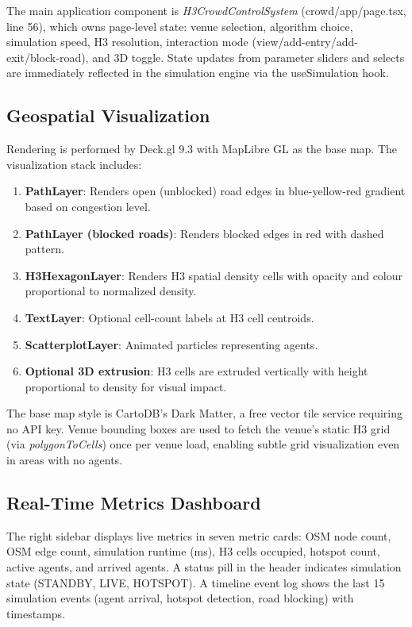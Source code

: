\documentclass[conference]{IEEEtran}
\begin{document}
The main application component is \textit{H3CrowdControlSystem} (crowd/app/page.tsx, line 56), which owns page-level state: venue selection, algorithm choice, simulation speed, H3 resolution, interaction mode (view/add-entry/add-exit/block-road), and 3D toggle. State updates from parameter sliders and selects are immediately reflected in the simulation engine via the useSimulation hook.

\subsection{Geospatial Visualization}

Rendering is performed by Deck.gl 9.3 with MapLibre GL as the base map. The visualization stack includes:

\begin{enumerate}
\item \textbf{PathLayer}: Renders open (unblocked) road edges in blue-yellow-red gradient based on congestion level.
\item \textbf{PathLayer (blocked roads)}: Renders blocked edges in red with dashed pattern.
\item \textbf{H3HexagonLayer}: Renders H3 spatial density cells with opacity and colour proportional to normalized density.
\item \textbf{TextLayer}: Optional cell-count labels at H3 cell centroids.
\item \textbf{ScatterplotLayer}: Animated particles representing agents.
\item \textbf{Optional 3D extrusion}: H3 cells are extruded vertically with height proportional to density for visual impact.
\end{enumerate}

The base map style is CartoDB's Dark Matter, a free vector tile service requiring no API key. Venue bounding boxes are used to fetch the venue's static H3 grid (via \textit{polygonToCells}) once per venue load, enabling subtle grid visualization even in areas with no agents.

\subsection{Real-Time Metrics Dashboard}

The right sidebar displays live metrics in seven metric cards: OSM node count, OSM edge count, simulation runtime (ms), H3 cells occupied, hotspot count, active agents, and arrived agents. A status pill in the header indicates simulation state (STANDBY, LIVE, HOTSPOT). A timeline event log shows the last 15 simulation events (agent arrival, hotspot detection, road blocking) with timestamps.
\end{document}
